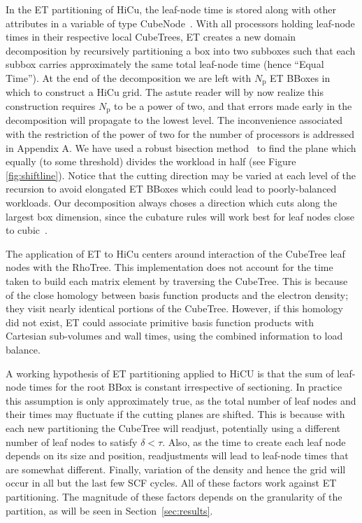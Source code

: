 \commentoutA{\documentclass[prl,aps,twocolumn,showpacs,twocolumngrid,superbib]{revtex4}}
\newcommand{\Np}{N_{\mathrm{p}}} \newcommand{\Nbox}{N_{\mathrm{b}}}
\begin{document}
In the ET partitioning of HiCu, the leaf-node time is stored along with other
attributes in a variable of type CubeNode~\cite{MChallacombe00A}.
With all processors holding leaf-node times in their respective local
CubeTrees, ET creates a new domain decomposition by recursively
partitioning a box into two subboxes such that each subbox carries
approximately the same total leaf-node time (hence ``Equal Time'').
At the end of the decomposition we are left with $\Np$ ET BBoxes in
which to construct a HiCu grid.  The astute reader will by now realize
this construction requires $\Np$ to be a power of two, and that errors
made early in the decomposition will propagate to the lowest level.
The inconvenience associated with the restriction of the power of two for the 
number of processors is addressed in Appendix A. 
We have used a robust bisection
method~\cite{WPress92} to find the plane which equally (to some
threshold) divides the workload in half (see Figure
\ref{fig:shiftline}). Notice that the cutting direction may be varied
at each level of the recursion to avoid elongated ET BBoxes which
could lead to poorly-balanced workloads. Our decomposition always
choses a direction which cuts along the largest box dimension, since
the cubature rules will work best for leaf nodes close to cubic~\cite{Stroud71}.

The application of ET to HiCu centers around interaction of the 
CubeTree leaf nodes with the RhoTree.  This implementation does not account
for the time taken to build each matrix element by traversing the CubeTree.
This is because of the close homology between basis function products
and the electron density; they visit nearly identical portions of the
CubeTree.  However, if this homology did not exist, ET  could
associate primitive basis function products with Cartesian sub-volumes 
and wall times, using the combined information to load balance.

A working hypothesis of ET partitioning applied to HiCU is that the sum of 
leaf-node times for the root BBox is constant irrespective of sectioning.  In
practice this assumption is only approximately true, as the total number of leaf nodes and
their times may fluctuate if the cutting planes are shifted. This is 
because with each new partitioning the CubeTree will
readjust, potentially using a different number of leaf nodes to satisfy
$\delta<\tau$.  Also, as the time to create each leaf node depends on
its size and position, readjustments will lead to leaf-node times that
are somewhat different. Finally, variation of the density and hence
the grid will occur in all but the last few SCF cycles.  All of these
factors work against ET partitioning.  The magnitude of these factors
depends on the granularity of the partition, as will be seen in 
Section~\ref{sec:results}.
\end{document}
